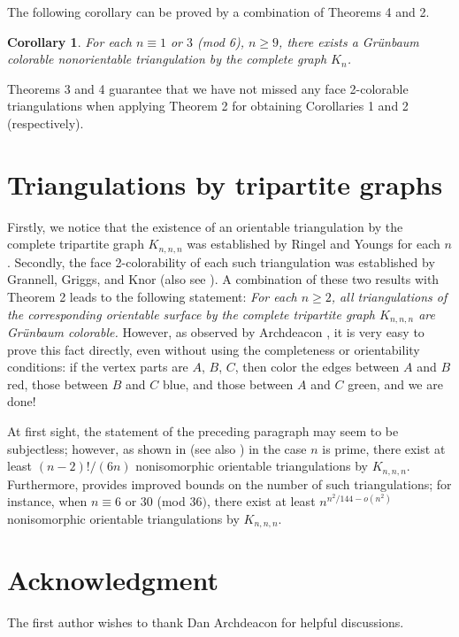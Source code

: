 \documentclass[12pt]{article}
\newtheorem{corollary}{Corollary}
\begin{document}
The following corollary can be proved by a combination of Theorems 4 and 2.
  
\begin{corollary}
For each  $n\equiv 1$ or $3$ {\rm (mod 6)}, $n\geqslant 9$,  there exists a Gr\"unbaum colorable nonorientable triangulation by the complete graph $K_n$.
\end{corollary}

Theorems 3 and 4 guarantee that we have not missed any face 2-colorable triangulations when applying Theorem 2 for obtaining Corollaries 1 and 2 (respectively).

\section{Triangulations by tripartite graphs}
Firstly, we notice that the existence of an orientable triangulation by the complete tripartite graph $K_{n,n,n}$   was established by Ringel and Youngs \cite{RY} for each $n$.  Secondly, the face 2-colorability of each such triangulation was established by Grannell, Griggs, and Knor \cite{GGK} (also see \cite{GG}). A combination of these two results with Theorem 2 leads to the following statement: {\it  For each $n \geqslant 2$,  all triangulations of the corresponding orientable surface by the complete tripartite graph $K_{n,n,n}$  are Gr\"unbaum colorable.} However, as observed by Archdeacon \cite{A}, it is very easy to prove this fact directly, even without using the completeness or orientability conditions: if the vertex parts are $A$, $B$, $C$, then color the edges between $A$  and $B$  red, those between $B$  and $C$  blue, and those between $A$  and $C$  green, and we are done!

At first sight, the statement of the preceding paragraph may seem to be subjectless; however, as shown in \cite{GGKS} (see also \cite{GG}) in the case $n$  is prime, there exist at least $(n-2)!/(6n)$  nonisomorphic orientable triangulations by $K_{n,n,n}$.  Furthermore, \cite{GKn}  provides improved bounds on the number of such triangulations; for instance, when $n\equiv 6$ or $30$ (mod $36)$,  there exist at least $n^{n^2/144-o(n^2)}$  nonisomorphic orientable triangulations by $K_{n,n,n}$.

\section*{Acknowledgment}
The first author wishes to thank Dan Archdeacon for helpful discussions.
\end{document}
